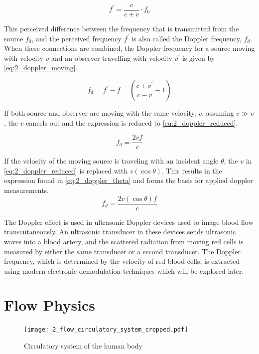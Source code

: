 \begin{equation} \label{eq:2_doppler_effect2}
	f^{\prime} = \frac{c}{c+v} \cdot f_{0}
\end{equation}

This perceived difference between the frequency that is transmitted from the source $f_{0}$, and the perceived frequency $f^{\prime}$ is also called the Doppler frequency, $f_{d}$. When these connections are combined, the Doppler frequency for a source moving with velocity $v$ and an observer travelling with velocity $v^{\prime}$ is given by \cref{eq:2_doppler_moving}.

\begin{equation} \label{eq:2_doppler_moving}
	f_{d} = f^{\prime} - f = \left( \frac{c + v^{\prime}}{c - v}-1 \right)
\end{equation}

If both source and observer are moving with the same velocity, $v$, assuming $c\gg v$, the $v$ cancels out and the expression is reduced to \cref{eq:2_doppler_reduced}.

\begin{equation} \label{eq:2_doppler_reduced}
	f_{d} = \frac{2 v f}{c}
\end{equation}

If the velocity of the moving source is traveling with an incident angle $\theta$, the $v$ in \cref{eq:2_doppler_reduced} is replaced with $v (\cos\theta)$. This results in the expression found in \cref{eq:2_doppler_theta} and forms the basis for applied \gls{doppler} measurements.
\begin{equation} \label{eq:2_doppler_theta}
	\boxed{f_{d} = \frac{2 v(\cos\theta) f}{c}}
\end{equation}

The Doppler effect is used in ultrasonic Doppler devices used to image blood flow \gls{transcutaneous}ly. An ultrasonic transducer in these devices sends ultrasonic waves into a blood artery, and the scattered radiation from moving red cells is measured by either the same transducer or a second transducer. The Doppler frequency, which is determined by the velocity of red blood cells, is extracted using modern electronic demodulation techniques which will be explored later.

\section{Flow Physics}
\begin{figure}[htbp]
	\centering
	\texttt{[image: 2\_flow\_circulatory\_system\_cropped.pdf]}
	\caption[Circulatory system of the human body]{Circulatory system of the human body \cite{JensenUltrasoundBook}}
	\label{fig:2_circulatory_system}
\end{figure}

